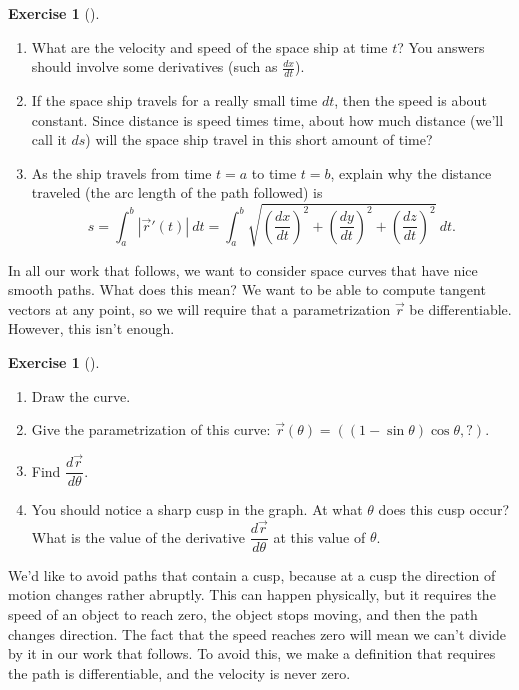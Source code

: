 \documentclass[10pt,]{book}
\theoremstyle{plain}
\theoremstyle{definition}
\theoremstyle{definition}
\theoremstyle{definition}
\theoremstyle{definition}
\newtheorem{exploration}[project]{Exercise}
\theoremstyle{definition}
\numberwithin{equation}{section}
\begin{document}
\begin{exploration}[]\label{exploration-164}
\leavevmode%
\begin{enumerate}[font=\bfseries,label=(\alph*),ref=\alph*]
\item\label{task-379} What are the velocity and speed of the space ship at time \(t\)? You answers should involve some derivatives (such as \(\frac{dx}{dt}\)).%
\item\label{task-380} If the space ship travels for a really small time \(dt\), then the speed is about constant. Since distance is speed times time, about how much distance (we'll call it \(ds\)) will the space ship travel in this short amount of time?%
\item\label{arc_length2} As the ship travels from time \(t=a\) to time \(t=b\), explain why the distance traveled (the arc length of the path followed) is%
\begin{equation*}
s=\int_a^b |\vec r '(t)|\ dt = \int_a^b \sqrt{\left(\frac{dx}{dt}\right)^2+\left(\frac{dy}{dt}\right)^2+\left(\frac{dz}{dt}\right)^2}\ dt .
\end{equation*}
%
\end{enumerate}
\end{exploration}
In all our work that follows, we want to consider space curves that have nice smooth paths. What does this mean? We want to be able to compute tangent vectors at any point, so we will require that a parametrization \(\vec r\) be differentiable. However, this isn't enough.%
\begin{exploration}[]\label{exploration-165}
\leavevmode%
\begin{enumerate}[font=\bfseries,label=(\alph*),ref=\alph*]
\item\label{task-382} Draw the curve.%
\item\label{task-383} Give the parametrization of this curve: \(\vec r(\theta) = ((1-\sin\theta)\cos\theta, ?)\).%
\item\label{task-384} Find \(\dfrac{d\vec r}{d\theta}\).%
\item\label{task-385} You should notice a sharp cusp in the graph. At what \(\theta\) does this cusp occur?  What is the value of the derivative \(\dfrac{d\vec r}{d\theta}\) at this value of \(\theta\).%
\end{enumerate}
\end{exploration}
We'd like to avoid paths that contain a cusp, because at a cusp the direction of motion changes rather abruptly. This can happen physically, but it requires the speed of an object to reach zero, the object stops moving, and then the path changes direction. The fact that the speed reaches zero will mean we can't divide by it in our work that follows. To avoid this, we make a definition that requires the path is differentiable, and the velocity is never zero.%
\end{document}
